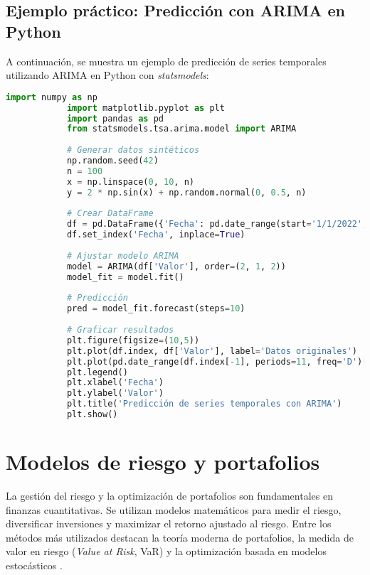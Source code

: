 \begin{itemize}
		\subsection{Ejemplo práctico: Predicción con ARIMA en Python}
		
		A continuación, se muestra un ejemplo de predicción de series temporales utilizando ARIMA en Python con \textit{statsmodels}:
		
		\begin{lstlisting}[language=Python, caption={Predicción de series temporales con ARIMA en Python}]
			import numpy as np
			import matplotlib.pyplot as plt
			import pandas as pd
			from statsmodels.tsa.arima.model import ARIMA
			
			# Generar datos sintéticos
			np.random.seed(42)
			n = 100
			x = np.linspace(0, 10, n)
			y = 2 * np.sin(x) + np.random.normal(0, 0.5, n)
			
			# Crear DataFrame
			df = pd.DataFrame({'Fecha': pd.date_range(start='1/1/2022', periods=n, freq='D'), 'Valor': y})
			df.set_index('Fecha', inplace=True)
			
			# Ajustar modelo ARIMA
			model = ARIMA(df['Valor'], order=(2, 1, 2))
			model_fit = model.fit()
			
			# Predicción
			pred = model_fit.forecast(steps=10)
			
			# Graficar resultados
			plt.figure(figsize=(10,5))
			plt.plot(df.index, df['Valor'], label='Datos originales')
			plt.plot(pd.date_range(df.index[-1], periods=11, freq='D')[1:], pred, label='Predicción', linestyle='dashed', color='red')
			plt.legend()
			plt.xlabel('Fecha')
			plt.ylabel('Valor')
			plt.title('Predicción de series temporales con ARIMA')
			plt.show()
		\end{lstlisting}
		\section{Modelos de riesgo y portafolios}
		
		La gestión del riesgo y la optimización de portafolios son fundamentales en finanzas cuantitativas. Se utilizan modelos matemáticos para medir el riesgo, diversificar inversiones y maximizar el retorno ajustado al riesgo. Entre los métodos más utilizados destacan la teoría moderna de portafolios, la medida de valor en riesgo (\textit{Value at Risk}, VaR) y la optimización basada en modelos estocásticos \cite{markowitz1952portfolio}.
		

\end{itemize}
